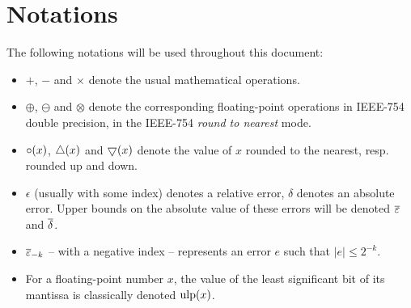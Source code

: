 %
%
%
%



\section{Notations\label{section:notations}}


The following notations will be used throughout this document:
\begin{itemize}

\item  $+$, $-$ and  $\times$ denote the usual
mathematical operations.

\item $\oplus$, $\ominus$ and $\otimes$ denote the
corresponding floating-point operations in IEEE-754 double precision,
in the IEEE-754 \emph{round to nearest} mode.

\item $\circ(x)$, $\bigtriangleup(x)$ and $\bigtriangledown(x)$ denote the value
  of $x$ rounded to the nearest, resp. rounded up and down.
  
\item $\epsilon$ (usually with some index) denotes a relative error,
  $\delta$ denotes an absolute error. Upper bounds on the absolute value of these errors
  will be denoted ${\overline{\varepsilon}}$ and ${\overline{\delta}}$.

\item ${\overline{\varepsilon}}_{-k}$ -- with a negative index -- represents an error $e$ such that $|e| \leq 2^{-k}$.
  
\item For a floating-point number $x$, the value of the least
  significant bit of its mantissa is classically denoted $\mbox{ulp}(x)$.

\end{itemize}




